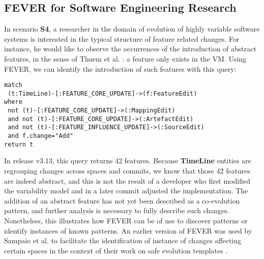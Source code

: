 \subsection{FEVER for Software Engineering Research}

In scenario \textbf{S4}, a researcher in the domain of evolution of highly variable software systems
is interested in the typical structure of feature related changes.
For instance, he would like to observe the occurrences of the introduction of abstract features, in the sense of Thuem et al. \citep{thuem_reasoning_2009}: a feature only exists in the VM.
Using FEVER, we can identify the introduction of such features with this query:
\vspace{-.5ex}
\begin{verbatim}
match 
 (t:TimeLine)-[:FEATURE_CORE_UPDATE]->(f:FeatureEdit)
where 
 not (t)-[:FEATURE_CORE_UPDATE]->(:MappingEdit)
 and not (t)-[:FEATURE_CORE_UPDATE]->(:ArtefactEdit)
 and not (t)-[:FEATURE_INFLUENCE_UPDATE]->(:SourceEdit)
 and f.change="Add"
return t
\end{verbatim}
\vspace{-.5ex}
In release v3.13, this query returns 42 features. 
Because \textbf{TimeLine} entities are regrouping changes across spaces and commits,
we know that those 42 features are indeed abstract, and this is not the result
of a developer who first modified the variability model and in a later commit adjusted the implementation.
The addition of an abstract feature has not yet been described as a co-evolution pattern, and further analysis 
is necessary to fully describe such changes. 
Nonetheless, this illustrates how FEVER can be of use to discover patterns or identify instances of known patterns.
An earlier version of FEVER was used by Sampaio et al. to facilitate the identification of instance of changes affecting certain spaces
in the context of their work on safe evolution templates \citep{sampaio_partially_2016}.

